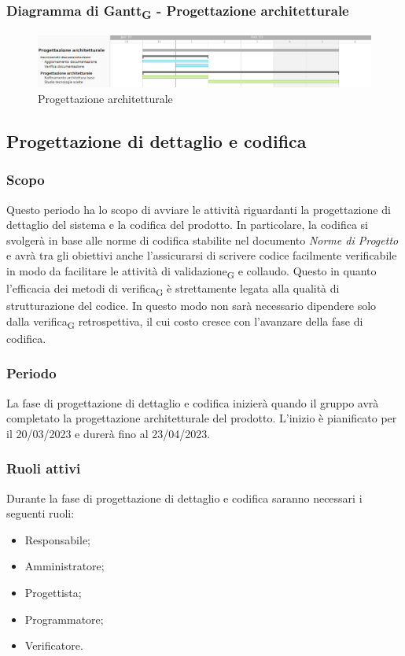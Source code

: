 \subsubsection{Diagramma di Gantt\textsubscript{G} - Progettazione architetturale}

\begin{figure}[H]
\centering
\includegraphics[width=\textwidth]{img/4_progettazione.png}
\caption{Progettazione architetturale}
\end{figure}

\subsection{Progettazione di dettaglio e codifica}
\subsubsection{Scopo}
Questo periodo ha lo scopo di avviare le attività riguardanti la progettazione di dettaglio del sistema e la codifica del prodotto.
In particolare, la codifica si svolgerà in base alle norme di codifica stabilite nel documento \textit{Norme di Progetto} e avrà tra gli obiettivi anche l’assicurarsi di scrivere codice facilmente verificabile in modo da facilitare le attività di validazione\textsubscript{G} e collaudo. Questo in quanto l'efficacia dei metodi di verifica\textsubscript{G} è strettamente legata alla qualità di strutturazione del codice. In questo modo non sarà necessario dipendere solo dalla verifica\textsubscript{G} retrospettiva, il cui costo cresce con l'avanzare della fase di codifica.

\subsubsection{Periodo}
La fase di progettazione di dettaglio e codifica inizierà quando il gruppo avrà completato la progettazione architetturale del prodotto. L'inizio è pianificato per il 20/03/2023 e durerà fino al 23/04/2023.

\subsubsection{Ruoli attivi}
Durante la fase di progettazione di dettaglio e codifica saranno necessari i seguenti ruoli:
\begin{itemize}
	\item Responsabile;
	\item Amministratore;
	\item Progettista;
	\item Programmatore;
	\item Verificatore.
\end{itemize}

